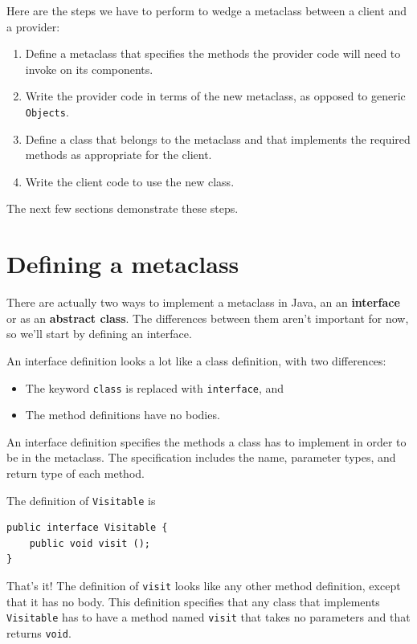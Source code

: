 \documentclass[12pt]{book}
\theoremstyle{exercise}
\begin{document}
Here are the steps we have to perform to wedge a metaclass
between a client and a provider:

\begin{enumerate}

\item Define a metaclass that specifies the methods
the provider code will need to invoke on its components.

\item Write the provider code in terms of the new metaclass,
as opposed to generic {\tt Objects}.

\item Define a class that belongs to the metaclass
and that implements the required methods 
as appropriate for the client.

\item Write the client code to use the new class.

\end{enumerate}

The next few sections demonstrate these steps.


\section {Defining a metaclass}

There are actually two ways to implement a metaclass in Java,
an an {\bf interface} or as an {\bf abstract class}.  The differences
between them aren't important for now, so we'll start by
defining an interface.

An interface definition looks a lot like a class
definition, with two differences:

\begin{itemize}

\item The keyword {\tt class} is replaced with {\tt interface}, and

\item The method definitions have no bodies.

\end{itemize}

An interface definition specifies the methods a class has to
implement in order to be in the metaclass.  The specification
includes the name, parameter
types, and return type of each method.

The definition of {\tt Visitable} is

\begin{verbatim}
public interface Visitable {
    public void visit ();
}
\end{verbatim}
%
That's it!  The definition of {\tt visit} looks like any other
method definition, except that it has no body.  This definition
specifies that any class that implements {\tt Visitable} has to have
a method named {\tt visit} that takes no parameters and that returns
{\tt void}.
\end{document}

